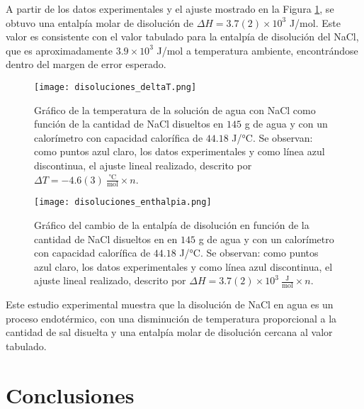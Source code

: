 \documentclass{article}
\begin{document}
A partir de los datos experimentales y el ajuste mostrado en la Figura \ref{fig:entalpia}, se obtuvo una entalpía molar de disolución de $\Delta H = 3.7(2)\times 10^3$ J/mol. Este valor es consistente con el valor tabulado para la entalpía de disolución del NaCl, que es aproximadamente $3.9 \times 10^3$ J/mol a temperatura ambiente, encontrándose dentro del margen de error esperado.

\begin{figure}[H]
    \centering
    \begin{minipage}{0.45\textwidth}
        \centering
        \texttt{[image: disoluciones\_deltaT.png]}
        \caption{Gráfico de la temperatura de la solución de agua con NaCl como función de la cantidad de NaCl disueltos en $145$ g de agua y con un calorímetro con capacidad calorífica de $44.18$ J/°C. Se observan: como puntos azul claro, los datos experimentales y como línea azul discontinua, el ajuste lineal realizado, descrito por $\Delta T = -4.6(3) \ \frac{\text{°C}}{\text{mol}} \times n$.}
        \label{fig:temperatura}
    \end{minipage}
    \hfill
    \begin{minipage}{0.45\textwidth}
        \centering
        \texttt{[image: disoluciones\_enthalpia.png]}
        \caption{Gráfico del cambio de la entalpía de disolución en función de la cantidad de NaCl disueltos en en $145$ g de agua y con un calorímetro con capacidad calorífica de $44.18$ J/°C. Se observan: como puntos azul claro, los datos experimentales y como línea azul discontinua, el ajuste lineal realizado, descrito por $\Delta H = 3.7(2)\times 10^3 \ \frac{\text{J}}{\text{mol}} \times n$.}
        \label{fig:entalpia}
    \end{minipage}
\end{figure}

Este estudio experimental muestra que la disolución de NaCl en agua es un proceso endotérmico, con una disminución de temperatura proporcional a la cantidad de sal disuelta y una entalpía molar de disolución cercana al valor tabulado.

\section{Conclusiones}
\end{document}
